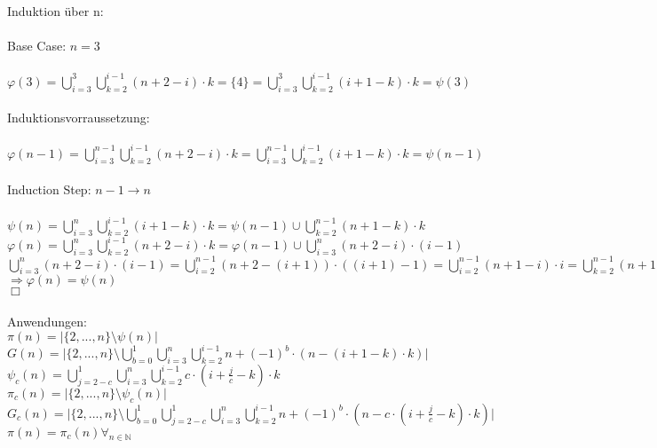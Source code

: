 \documentclass[12pt,ngerman]{article}
\theoremstyle{definition}
\begin{document}
Induktion über n:\\\\
Base Case: $n=3$\\\\
$\varphi(3) = \bigcup\limits_{i = 3}^{3} \bigcup\limits_{k = 2}^{i-1} (n+2-i) \cdot k = \{4\} = \bigcup\limits_{i = 3}^{3} \bigcup\limits_{k = 2}^{i-1} (i+1-k) \cdot k = \psi(3)$\\\\
Induktionsvorraussetzung:\\\\
$\varphi(n-1) = \bigcup\limits_{i = 3}^{n-1} \bigcup\limits_{k = 2}^{i-1} (n+2-i) \cdot k = \bigcup\limits_{i = 3}^{n-1} \bigcup\limits_{k = 2}^{i-1} (i+1-k) \cdot k = \psi(n-1)$\\\\
Induction Step: $n-1 \rightarrow n$\\\\
$\psi(n) = \bigcup\limits_{i = 3}^{n} \bigcup\limits_{k = 2}^{i-1} (i+1-k) \cdot k = \psi(n-1) \cup \bigcup\limits_{k = 2}^{n-1} (n+1-k) \cdot k$\\
$\varphi(n) = \bigcup\limits_{i = 3}^{n} \bigcup\limits_{k = 2}^{i-1} (n+2-i) \cdot k = \varphi(n-1) \cup \bigcup\limits_{i = 3}^{n} (n+2-i) \cdot (i-1)$\\
$\bigcup\limits_{i = 3}^{n} (n+2-i) \cdot (i-1) = \bigcup\limits_{i = 2}^{n-1} (n+2-(i+1)) \cdot ((i+1)-1) = \bigcup\limits_{i = 2}^{n-1} (n+1-i) \cdot i = \bigcup\limits_{k = 2}^{n-1} (n+1-k) \cdot k$\\
$\Rightarrow \varphi(n) = \psi(n)$\\
$\Box$\\\\
Anwendungen:\\
$\pi(n) = \vert \{2,...,n\} \setminus \psi(n) \vert$\\
$G(n) = \vert \{2,...,n\} \setminus \bigcup\limits_{b = 0}^{1} \bigcup\limits_{i = 3}^{n} \bigcup\limits_{k = 2}^{i-1} n + (-1)^b \cdot (n - (i + 1 - k) \cdot k) \vert$\\
$\psi_c(n) = \bigcup\limits_{j = 2-c}^{1} \bigcup\limits_{i = 3}^{n} \bigcup\limits_{k = 2}^{i-1} c \cdot (i + \frac{j}{c} - k) \cdot k$\\
$\pi_c(n) = \vert \{2,...,n\} \setminus \psi_c(n) \vert$\\
$G_c(n) = \vert \{2,...,n\} \setminus \bigcup\limits_{b = 0}^{1} \bigcup\limits_{j = 2-c}^{1} \bigcup\limits_{i = 3}^{n} \bigcup\limits_{k = 2}^{i-1} n + (-1)^b \cdot (n - c \cdot (i + \frac{j}{c} - k) \cdot k) \vert$\\
$\pi(n) = \pi_c(n) \forall_{n \in \mathbb{N}}$
\end{document}
